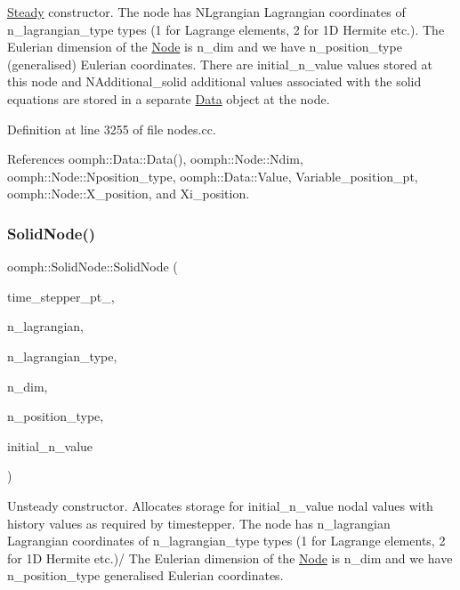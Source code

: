 \hyperlink{classoomph_1_1Steady}{Steady} constructor. The node has N\+Lgrangian Lagrangian coordinates of n\+\_\+lagrangian\+\_\+type types (1 for Lagrange elements, 2 for 1D Hermite etc.). The Eulerian dimension of the \hyperlink{classoomph_1_1Node}{Node} is n\+\_\+dim and we have n\+\_\+position\+\_\+type (generalised) Eulerian coordinates. There are initial\+\_\+n\+\_\+value values stored at this node and N\+Additional\+\_\+solid additional values associated with the solid equations are stored in a separate \hyperlink{classoomph_1_1Data}{Data} object at the node. 

Definition at line 3255 of file nodes.\+cc.



References oomph\+::\+Data\+::\+Data(), oomph\+::\+Node\+::\+Ndim, oomph\+::\+Node\+::\+Nposition\+\_\+type, oomph\+::\+Data\+::\+Value, Variable\+\_\+position\+\_\+pt, oomph\+::\+Node\+::\+X\+\_\+position, and Xi\+\_\+position.

\mbox{\label{classoomph_1_1SolidNode_a439c1ce56488d9fdc9c9511e1df9152d}} 
\subsubsection{\texorpdfstring{Solid\+Node()}{SolidNode()}\hspace{0.1cm}{\footnotesize\ttfamily [3/4]}}
{\footnotesize\ttfamily oomph\+::\+Solid\+Node\+::\+Solid\+Node (\begin{DoxyParamCaption}\item[{\hyperlink{classoomph_1_1TimeStepper}{Time\+Stepper} $\ast$const \&}]{time\+\_\+stepper\+\_\+pt\+\_\+,  }\item[{const unsigned \&}]{n\+\_\+lagrangian,  }\item[{const unsigned \&}]{n\+\_\+lagrangian\+\_\+type,  }\item[{const unsigned \&}]{n\+\_\+dim,  }\item[{const unsigned \&}]{n\+\_\+position\+\_\+type,  }\item[{const unsigned \&}]{initial\+\_\+n\+\_\+value }\end{DoxyParamCaption})}



Unsteady constructor. Allocates storage for initial\+\_\+n\+\_\+value nodal values with history values as required by timestepper. The node has n\+\_\+lagrangian Lagrangian coordinates of n\+\_\+lagrangian\+\_\+type types (1 for Lagrange elements, 2 for 1D Hermite etc.)/ The Eulerian dimension of the \hyperlink{classoomph_1_1Node}{Node} is n\+\_\+dim and we have n\+\_\+position\+\_\+type generalised Eulerian coordinates. 

